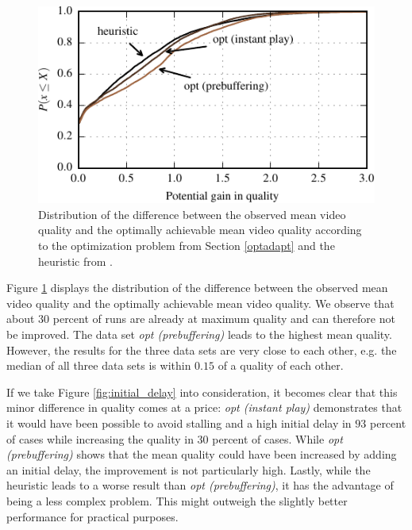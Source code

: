 \begin{figure}[t]
\centering
\includegraphics[width=\columnwidth]{figs/qualitygain_py}%
\caption{Distribution of the difference between the observed mean video quality and the  optimally achievable mean video quality  according to the optimization problem from Section \ref{optadapt} and the heuristic from \cite{sieber16sacrificing}.}
\label{fig:opt}%
\end{figure}

Figure \ref{fig:opt} displays the distribution of the difference between the observed mean video quality and the optimally achievable mean video quality. We observe that about $30$ percent of runs are already at maximum quality and can therefore not be improved. The data set \textit{opt (prebuffering)} leads to the highest mean quality. However, the results for the three data sets are very close to each other, e.g. the median of all three data sets is within $0.15$ of a quality of each other.

If we take Figure \ref{fig:initial_delay} into consideration, it becomes clear that this minor difference in quality comes at a price: \textit{opt (instant play)} demonstrates that it would have been possible to avoid stalling and a high initial delay in $93$ percent of cases while increasing the quality in $30$ percent of cases. While \textit{opt (prebuffering)} shows that the mean quality could have been increased by adding an initial delay, the improvement is not particularly high. Lastly, while the heuristic leads to a worse result than \textit{opt (prebuffering)}, it has the advantage of being a less complex problem. This might outweigh the slightly better performance for practical purposes.

